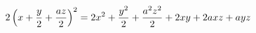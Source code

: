 \documentclass[preview]{standalone}
\begin{document}
\begin{align*}
\special{dvisvgm:raw <g id='unique000'>}2\left(x+\dfrac{y}{2}+\dfrac{az}{2}\right)^2=2x^2+\dfrac{y^2}{2}+\dfrac{a^2z^2}{2}+2xy+2axz+ayz\special{dvisvgm:raw </g>}
\end{align*}
\end{document}
